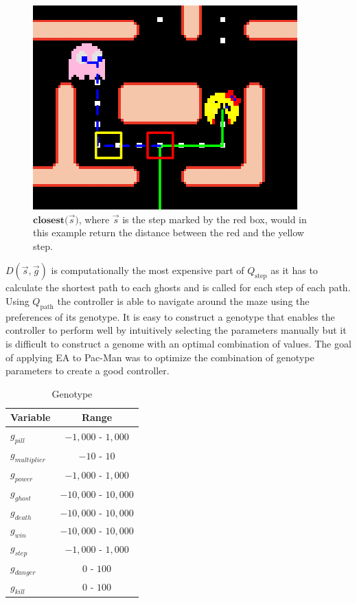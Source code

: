 \documentclass[conference]{IEEEtran}
\begin{document}
\begin{figure}[!htb]
\centering
\includegraphics[scale=.3]{closest.png}
\caption{$\mathbf{closest(}\vec{s})$, where $\vec{s}$ is the step marked by the red box, would in this example return the distance between the red and the yellow step.}
\label{fig:closest}
\end{figure}

$D(\vec{s}, \vec{g})$ is computationally the most expensive part of $Q_{\mathrm{step}}$ as it has to calculate the shortest path to each ghosts and is called for each step of each path.  \\

Using $Q_{\mathrm{path}}$ the controller is able to navigate around the maze using the preferences of its genotype. It is easy to construct a genotype that enables the controller to perform well by intuitively selecting the parameters manually but it is difficult to construct a genome with an optimal combination of values. The goal of applying EA to Pac-Man was to optimize the combination of genotype parameters to create a good controller.

\begin{table}
\begin{center}
\caption{Genotype}
\label{table-genotype}
\begin{tabular}{|l|c|}
\hline
Variable    & Range	\\
\hline
$g_{pill}$ & $-1,000$ - $1,000$\\
\hline
$g_{multiplier}$ & $-10$ - $10$\\
\hline
$g_{power}$ & $-1,000$ - $1,000$\\
\hline
$g_{ghost}$ & $-10,000$ - $10,000$\\
\hline
$g_{death}$ & $-10,000$ - $10,000$\\
\hline
$g_{win}$ & $-10,000$ - $10,000$\\
\hline
$g_{step}$ & $-1,000$ - $1,000$\\
\hline
$g_{danger}$ & $0$ - $100$\\
\hline
$g_{kill}$ & $0$ - $100$\\
\hline
\end{tabular}
\end{center}
\end{table}
\end{document}
